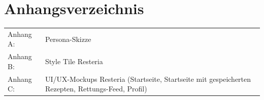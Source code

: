 \documentclass[11pt, a4paper, oneside, ngerman]{article}
\begin{document}
\section*{Anhangsverzeichnis}
\begin{tabular}{p{2.5cm}p{10cm}}
Anhang A: & Persona-Skizze \\
Anhang B: & Style Tile Resteria \\
Anhang C: & UI/UX-Mockups Resteria (Startseite, Startseite mit gespeicherten Rezepten, Rettungs-Feed, Profil) \\
\end{tabular}


\appendix

\end{document}
